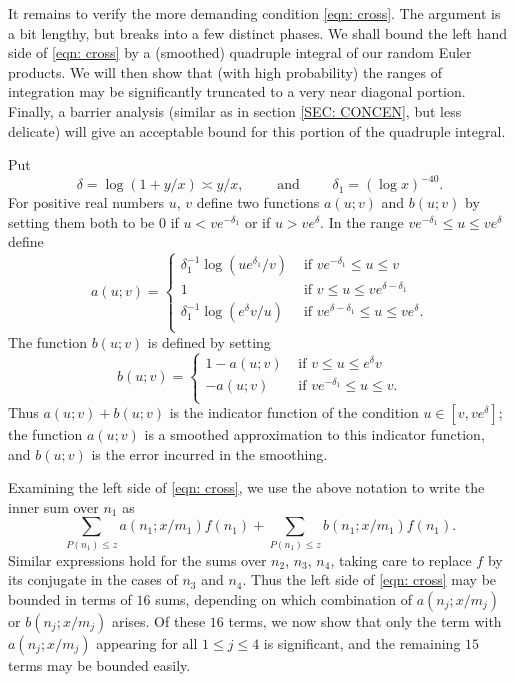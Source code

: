 \documentclass[12pt, notitlepage]{amsart}
\numberwithin{equation}{section}
\theoremstyle{remark}
\theoremstyle{definition}
\theoremstyle{remark}
\numberwithin{equation}{section}
\begin{document}
  
 
It remains to verify the more demanding condition \eqref{eqn: cross}. The argument is a bit lengthy, but breaks into a few distinct phases. We shall bound the left hand side of \eqref{eqn: cross} by a (smoothed) quadruple integral of our random Euler products. We will then show that (with high probability) the ranges of integration may be significantly truncated to a very near diagonal portion. Finally, a barrier analysis (similar as in section \ref{SEC: CONCEN}, but less delicate) will give an acceptable bound for this portion of the quadruple integral.

  Put 
\begin{equation} 
\label{4.4} 
\delta= \log (1 +y/x) \asymp y/x, \qquad \text{ and } \qquad \delta_1 = (\log x)^{-40}. 
\end{equation} 
For positive real numbers $u$, $v$ define two functions $a(u;v)$ and $b(u;v)$ by setting them both to be $0$ if $u<ve^{-\delta_1}$ or if $u> ve^{\delta}$.   In the range $ve^{-\delta_1} \le u \le v e^{\delta}$ define 
\begin{equation} 
\label{4.5} 
a(u;v) = \begin{cases} 
\delta_1^{-1} \log(ue^{\delta_1}/v) &\text{ if } ve^{-\delta_1} \le u \le v \\ 
1 & \text{ if } v \le u \le ve^{\delta-\delta_1}\\ 
\delta_1^{-1} \log (e^{\delta}v/u) &\text{ if } ve^{\delta-\delta_1} \le u\le ve^{\delta} .\\ 
\end{cases}
\end{equation} 
The function $b(u;v)$ is defined by setting 
\begin{equation} 
\label{4.6} 
b(u;v) = \begin{cases} 
1- a(u;v) &\text{ if } v\le u \le e^{\delta}v\\ 
-a(u;v) &\text{ if } ve^{-\delta_1} \le u\le v .\\
\end{cases}
\end{equation} 
Thus $a(u;v)+b(u;v)$ is the indicator function of the condition $u \in [v,ve^{\delta}]$;  the function $a(u;v)$ is a smoothed approximation to this indicator function, and $b(u;v)$ is the error incurred in the smoothing.  

Examining the left side of \eqref{eqn: cross}, we use the above notation to write the inner sum over $n_1$ as 
$$ 
\sum_{P(n_1) \le z} a(n_1;x/m_1) f(n_1) + \sum_{P(n_1) \le z} b(n_1; x/m_1) f(n_1).
$$ 
Similar expressions hold for the sums over $n_2$, $n_3$, $n_4$, taking care to replace $f$ by its conjugate in the cases of $n_3$ and $n_4$.   Thus the left side of \eqref{eqn: cross} may be bounded in terms of $16$ sums, depending on which combination of $a(n_j;x/m_j)$ or $b(n_j; x/m_j)$ arises.   Of these $16$ terms, we now show that only the term with $a(n_j;x/m_j)$ appearing for all $1\le j\le 4$ is significant, and the remaining $15$ terms may be bounded easily.   
\end{document}
